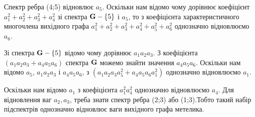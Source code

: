 Спектр ребра (4;5) відновлює $a_5$. Оскільки нам відомо чому дорівнює коефіцієнт $a_1^2+a_2^2+a_3^2+a_4^2$ зі спектра ${\bf G}-\{5\}$ і $a_5$, то з коефіцієнта характеристичного многочлена вихідного графа $a_1^2+a_2^2+a_3^2+a_4^2+a_5^2+a_6^2$ однозначно відновлюємо $a_6$.

Зі спектра ${\bf G}-\{5\}$ відомо чому дорівнює $a_1a_2a_3$. З коефіцієнта $(a_1a_2a_3 + a_4a_5a_6)$ спектра $\bf G$ можемо знайти значення $a_4a_5a_6$. Оскільки нам відомо $a_5$, $a_1a_2a_3$ і $a_4a_5a_6$, з $(a_1a_2a_3a_5^2 +a_4a_5a_6a_1^2)$ однозначно відновлюємо $a_1$.

Оскільки нам відомо $a_1$ з коефіцієнта $a_1^2a_4^2$ однозначно відновлюємо $a_4$.
Для відновлення ваг $a_2,a_3$, треба знати спектр ребра (2;3) або (1;3).Тобто такий набір підспектрів однозначно відновлює ваги вихідного графа метелика.

